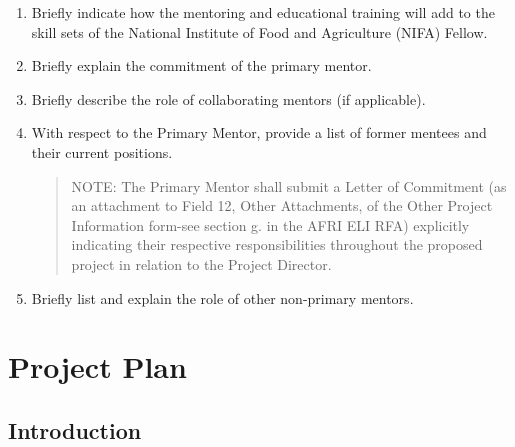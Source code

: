 \documentclass[12pt,letterpaper]{article}
\begin{document}
\begin{enumerate}

  \item Briefly indicate how the mentoring and educational training will add to the
   skill sets of the National Institute of Food and Agriculture (NIFA) Fellow.

  \item Briefly explain the commitment of the primary mentor.

  \item Briefly describe the role of collaborating mentors (if applicable).

  \item With respect to the Primary Mentor, provide a list of former mentees and
   their current positions. 
   \begin{quote}
   NOTE: The Primary Mentor shall submit a Letter of Commitment (as an
   attachment to Field 12, Other Attachments, of the Other Project
   Information form-see section g. in the AFRI ELI RFA) explicitly
   indicating their respective responsibilities throughout the proposed
   project in relation to the Project Director.
   \end{quote}

  \item Briefly list and explain the role of other non-primary mentors.

\end{enumerate}


\section{Project Plan}


\subsection{Introduction}

\end{document}
